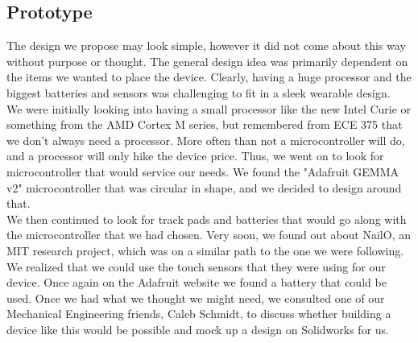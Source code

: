 \documentclass[12pt,letterpaper]{article}
\begin{document}
\subsection*{Prototype}
\hspace{1cm}The design we propose may look simple, however it did not come about this way without purpose or thought. The general design idea was primarily dependent on the items we wanted to place the device. Clearly, having a huge processor and the biggest batteries and sensors was challenging to fit in a sleek wearable design.\\
\hspace{1cm}We were initially looking into having a small processor like the new Intel Curie or something from the AMD Cortex M series, but remembered from ECE 375 that we don't always need a processor. More often than not a microcontroller will do, and a processor will only hike the device price. Thus, we went on to look for microcontroller that would service our needs. We found the "Adafruit GEMMA v2" microcontroller that was circular in shape, and we decided to design around that.\\
\hspace{1cm}We then continued to look for track pads and batteries that would go along with the microcontroller that we had chosen. Very soon, we found out about NailO, an MIT research project, which was on a similar path to the one we were following. We realized that we could use the touch sensors that they were using for our device. Once again on the Adafruit website we found a battery that could be used. Once we had what we thought we might need, we consulted one of our Mechanical Engineering friends, Caleb Schmidt, to discuss whether building a device like this would be possible and mock up a design on Solidworks for us.\\
\end{document}
